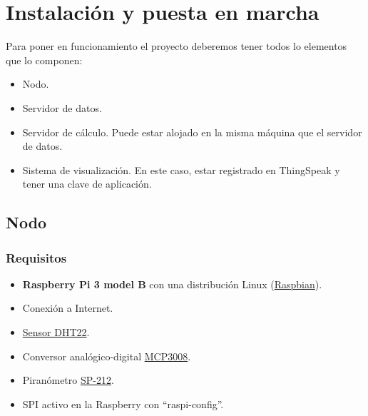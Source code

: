 \cleardoublepage

\chapter{Instalación y puesta en marcha}
\label{makereference7}

Para poner en funcionamiento el proyecto deberemos tener todos lo elementos que lo componen:
\begin{itemize}
\item Nodo.
\item Servidor de datos.
\item Servidor de cálculo. Puede estar alojado en la misma máquina que el servidor de datos.
\item Sistema de visualización. En este caso, estar registrado en ThingSpeak y tener una clave de aplicación.
\end{itemize}

\section{Nodo}
\label{makereference7.1}
\subsection{Requisitos}
\label{makereference7.1.2}
	\begin{itemize}
		\item \textbf{Raspberry Pi 3 model B} con una distribución Linux (\href{https://www.raspberrypi.org/downloads/raspbian/}{Raspbian}).
		\item Conexión a Internet.
		\item \href{https://www.adafruit.com/product/385}{Sensor DHT22}.
		\item Conversor analógico-digital \href{https://www.adafruit.com/product/856}{MCP3008}.
		\item Piranómetro \href{https://www.apogeeinstruments.co.uk/content/SP-212-215-manual.pdf}{SP-212}.
		\item SPI activo en la Raspberry con ``raspi-config''.
	\end{itemize}

